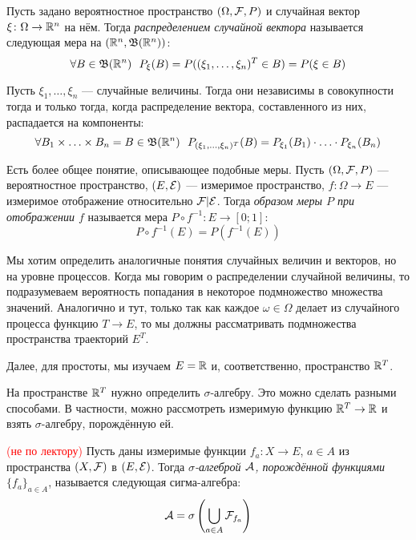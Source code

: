 \begin{reminder}
	Пусть задано вероятностное пространство $(\Omega, \mathcal{F}, P)$ и случайная вектор $\xi \colon \Omega \to \mathbb{R}^n$ на нём. Тогда \textit{распределением случайной вектора} называется следующая мера на $(\mathbb{R}^n, \mathfrak{B}(\mathbb{R}^n))$:
	\[
	\forall B \in \mathfrak{B}(\mathbb{R}^n)\ \ P_\xi(B) = P((\xi_1, \ldots, \xi_n)^T \in B) = P(\xi \in B)
	\]
\end{reminder}

\begin{reminder}
	Пусть $\xi_1, \ldots, \xi_n$ --- случайные величины. Тогда они независимы в совокупности тогда и только тогда, когда распределение вектора, составленного из них, распадается на компоненты:
	\[
	\forall B_1 \times \ldots \times B_n = B \in \mathfrak{B}(\mathbb{R}^n)\ \ P_{(\xi_1, \ldots, \xi_n)^T}(B) = P_{\xi_1}(B_1) \cdot \ldots \cdot P_{\xi_n}(B_n)
	\]
\end{reminder}

\begin{note}
	Есть более общее понятие, описывающее подобные меры. Пусть $(\Omega, \mathcal{F}, P)$ --- вероятностное пространство, $(E, \mathcal{E})$ --- измеримое пространство, $f \colon \Omega \to E$ --- измеримое отображение относительно $\mathcal{F}|\mathcal{E}$. Тогда \textit{образом меры $P$ при отображении $f$} называется мера $P \circ f^{-1} \colon E \to [0; 1]$:
	\[
		P \circ f^{-1}(E) = P(f^{-1}(E))
	\]
\end{note}

\begin{note}
	Мы хотим определить аналогичные понятия случайных величин и векторов, но на уровне процессов. Когда мы говорим о распределении случайной величины, то подразумеваем вероятность попадания в некоторое подмножество множества значений. Аналогично и тут, только так как каждое $\omega \in \Omega$ делает из случайного процесса функцию $T \to E$, то мы должны рассматривать подмножества пространства траекторий $E^T$.
\end{note}

\begin{note}
	Далее, для простоты, мы изучаем $E = \mathbb{R}$ и, соответственно, пространство $\mathbb{R}^T$.
\end{note}

\begin{note}
	На пространстве $\mathbb{R}^T$ нужно определить $\sigma$-алгебру. Это можно сделать разными способами. В частности, можно рассмотреть измеримую функцию $\mathbb{R}^T \to \mathbb{R}$ и взять $\sigma$-алгебру, порождённую ей.
\end{note}

\begin{definition} \textcolor{red}{(не по лектору)}
	Пусть даны измеримые функции $f_a \colon X \to E$, $a \in A$ из пространства $(X, \mathcal{F})$ в $(E, \mathcal{E})$. Тогда \textit{$\sigma$-алгеброй $\mathcal{A}$, порождённой функциями $\{f_a\}_{a \in A}$}, называется следующая сигма-алгебра:
	\[
		\mathcal{A} = \sigma\left(\bigcup_{a \in A} \mathcal{F}_{f_a}\right)
	\]
\end{definition}

